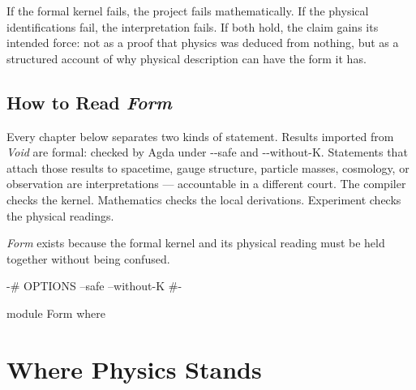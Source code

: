 \documentclass[11pt,a4paper]{book}
\newcommand{\AgdaFlag}[1]{\texttt{-{}-#1}}
\def\texttt#1{#1}%
\begin{document}
If the formal kernel fails, the project fails mathematically.  If the
physical identifications fail, the interpretation fails.  If both hold, the
claim gains its intended force: not as a proof that physics was deduced
from nothing, but as a structured account of why physical description can
have the form it has.

\chapter*{How to Read \emph{Form}}

Every chapter below separates two kinds of statement.  Results imported
from \emph{Void} are formal: checked by Agda under \AgdaFlag{safe} and
\AgdaFlag{without-K}.  Statements that attach those results to spacetime,
gauge structure, particle masses, cosmology, or observation are
interpretations --- accountable in a different court.  The compiler checks
the kernel.  Mathematics checks the local derivations.  Experiment checks
the physical readings.

\emph{Form} exists because the formal kernel and its physical reading must
be held together without being confused.

\mainmatter


\begin{code}
{-# OPTIONS --safe --without-K #-}

module Form where
\end{code}


\part*{Where Physics Stands}
\end{document}

